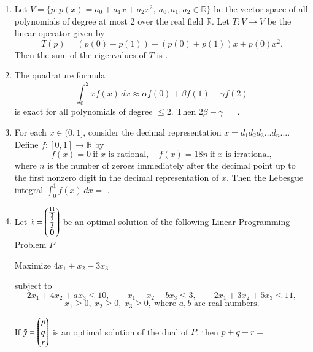 \documentclass[journal,12pt,onecolumn]{IEEEtran}
\theoremstyle{remark}
\begin{document}
\begin{enumerate}[start=1, label=Q.\arabic*]
\hfill{}


\item Let $V=\{p : p(x)=a_{0}+a_{1}x+a_{2}x^{2}, \ a_{0},a_{1},a_{2}\in \mathbb{R}\}$ be the vector space of all polynomials of degree at most $2$ over the real field $\mathbb{R}$.  
Let $T: V\to V$ be the linear operator given by
\[
T(p)=(p(0)-p(1))+(p(0)+p(1))x+p(0)x^{2}.
\]
Then the sum of the eigenvalues of $T$ is \underline{\hspace{2cm}}.  

\hfill{}


\item The quadrature formula
\[
\int_{0}^{2}x f(x)\,dx \approx \alpha f(0)+\beta f(1)+\gamma f(2)
\]
is exact for all polynomials of degree $\leq 2$. Then $2\beta-\gamma=$ \underline{\hspace{2cm}}.  

\hfill{}


\item For each $x \in (0,1]$, consider the decimal representation $x=d_{1}d_{2}d_{3}\dots d_{n}\dots$.  
Define $f: [0,1]\to \mathbb{R}$ by
\[
f(x)=0 \ \text{if $x$ is rational}, \quad f(x)=18n \ \text{if $x$ is irrational},
\]
where $n$ is the number of zeroes immediately after the decimal point up to the first nonzero digit in the decimal representation of $x$.  
Then the Lebesgue integral $\int_{0}^{1} f(x)\,dx=$ \underline{\hspace{2cm}}.  

\hfill{}
\item Let $\tilde{x}=\begin{pmatrix}\tfrac{11}{3}\\ \tfrac{2}{3}\\ 0\end{pmatrix}$ be an optimal solution of the following Linear Programming Problem $P$\brak{:}

Maximize $4x_{1}+x_{2}-3x_{3}$

subject to
\[
2x_{1}+4x_{2}+a x_{3}\le 10,\qquad
x_{1}-x_{2}+b x_{3}\le 3,\qquad
2x_{1}+3x_{2}+5x_{3}\le 11,
\]
\[
x_{1}\ge 0,\ x_{2}\ge 0,\ x_{3}\ge 0,\ \text{where } a,b \text{ are real numbers.}
\]

If $\tilde{y}=\begin{pmatrix}p\\ q\\ r\end{pmatrix}$ is an optimal solution of the dual of $P$, then $p+q+r=$ \underline{\hspace{2cm}} \ .

\hfill{}
\end{enumerate}
\end{document}
